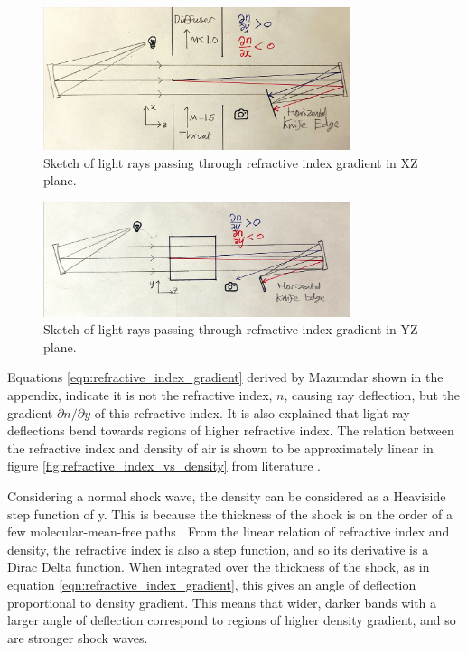 \documentclass{article}
\begin{document}
\begin{figure}[H]
    \centering
    \includegraphics[width=0.8\textwidth]{xz_shlierian.jpg}
    \caption{Sketch of light rays passing through refractive index gradient in XZ plane.}
    \label{fig:xz_shlierian}
\end{figure}

\begin{figure}[H]
    \centering
    \includegraphics[width=0.8\textwidth]{yz_shlierian.jpg}
    \caption{Sketch of light rays passing through refractive index gradient in YZ plane.}
    \label{fig:yz_shlierian}
\end{figure}

Equations \ref{eqn:refractive_index_gradient} derived by Mazumdar \cite{Mazumdar_Amrita:2013} shown in the appendix, indicate it is not the refractive index, $n$, causing ray deflection, but the gradient $\partial n / \partial y$ of this refractive index.
It is also explained that light ray deflections bend towards regions of higher refractive index.
The relation between the refractive index and density of air is shown to be approximately linear in figure \ref{fig:refractive_index_vs_density} from literature \cite{refractiveindex_info} \cite{Ciddor:96}.

Considering a normal shock wave, the density can be considered as a Heaviside step function of y.
This is because the thickness of the shock is on the order of a few molecular-mean-free paths \cite{babinsky_delery:2011}.
From the linear relation of refractive index and density, the refractive index is also a step function, and so its derivative is a Dirac Delta function.
When integrated over the thickness of the shock, as in equation \ref{eqn:refractive_index_gradient}, this gives an angle of deflection proportional to density gradient.
This means that wider, darker bands with a larger angle of deflection correspond to regions of higher density gradient, and so are stronger shock waves.
\end{document}
